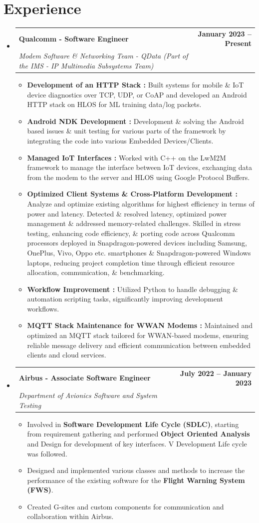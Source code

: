 \documentclass[letterpaper,11pt]{article}
\makeatletter
\newcommand{\resumeItem}[1]{
  \item\small{
    {\justifying #1 \vspace{-2pt}}
  }
}
\newcommand{\resumeSubheading}[4]{
  \vspace{-2pt}\item
    \begin{tabular*}{1.0\textwidth}[t]{l@{\extracolsep{\fill}}r}
      \textbf{#1} & \textbf{\small #2} \\
      \textit{\small#3} & \textit{\small #4} \\
    \end{tabular*}\vspace{-7pt}
}
\newcommand{\resumeSubHeadingListStart}{\begin{itemize}[leftmargin=0.0in, label={}]}
\newcommand{\resumeSubHeadingListEnd}{\end{itemize}}
\makeatother
\begin{document}
\section{Experience}
  \resumeSubHeadingListStart
    \resumeSubheading
      {Qualcomm - Software Engineer}{January 2023 -- Present}
      {Modem Software \& Networking Team - QData (Part of the IMS - IP Multimedia Subsystems Team) }{}
     \begin{itemize}[itemsep=3pt]
  \resumeItem{\textbf{Development of an HTTP Stack :} Built systems for mobile \& IoT device diagnostics over TCP, UDP, or CoAP and developed an Android HTTP stack on HLOS for ML training data/log packets.}
  \resumeItem{\textbf{Android NDK Development :} Development \& solving the Android based issues \& unit testing for various parts of the framework by integrating the code into various Embedded Devices/Clients.}
  \resumeItem{\textbf{Managed IoT Interfaces :} Worked with C++ on the LwM2M framework to manage the interface between IoT devices, exchanging data from the modem to the server and HLOS using Google Protocol Buffers.}
  \resumeItem{\textbf{Optimized Client Systems \& Cross-Platform Development :} Analyze and optimize existing algorithms for highest efficiency in terms of power and latency. Detected \& resolved latency, optimized power management \& addressed memory-related challenges. Skilled in stress testing, enhancing code efficiency, \& porting code across Qualcomm processors deployed in Snapdragon-powered devices including Samsung, OnePlus, Vivo, Oppo etc. smartphones \& Snapdragon-powered Windows laptops, reducing project completion time through efficient resource allocation, communication, \& benchmarking.}
  \resumeItem{\textbf{Workflow Improvement :} Utilized Python to handle debugging \& automation scripting tasks, significantly improving development workflows.}
  \resumeItem{\textbf{MQTT Stack Maintenance for WWAN Modems :} Maintained and optimized an MQTT stack tailored for WWAN-based modems, ensuring reliable message delivery and efficient communication between embedded clients and cloud services.}
\end{itemize}
     \resumeSubheading
      {Airbus - Associate Software Engineer }{July 2022 -- January 2023}
      {Department of Avionics Software and System Testing}{}
      \begin{itemize}[itemsep=3pt]
        \resumeItem{Involved in \textbf{Software Development Life Cycle (SDLC)}, starting from requirement gathering and performed \textbf{Object Oriented Analysis} and Design for development of key interfaces. V Development Life cycle was followed.}
        \resumeItem{Designed and implemented various classes and methods to increase the performance of the existing software for \newline the \textbf{Flight Warning System (FWS)}.}
        \resumeItem{Created G-sites and custom components for communication and collaboration within Airbus.}
    \end{itemize}
  \resumeSubHeadingListEnd
\vspace{-12pt}
\end{document}
